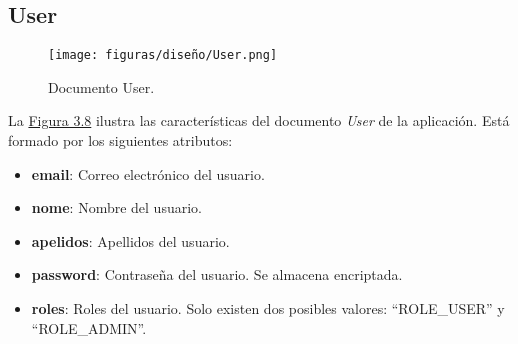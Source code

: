 \subsection{User}

\begin{figure}[H]
\centerline{\texttt{[image: figuras/diseño/User.png]}}
\caption{Documento User.}
\label{enlaceUser}
\end{figure}

La \hyperref[enlaceUser]{Figura 3.8} ilustra las características del documento {\it User} de la aplicación. Está formado por los siguientes atributos:

\begin{itemize}
    \item {\bf email}: Correo electrónico del usuario.
    \item {\bf nome}: Nombre del usuario.
    \item {\bf apelidos}: Apellidos del usuario.
    \item {\bf password}: Contraseña del usuario. Se almacena encriptada.
    \item {\bf roles}: Roles del usuario. Solo existen dos posibles valores: ``ROLE\_USER'' y ``ROLE\_ADMIN''.
\end{itemize}